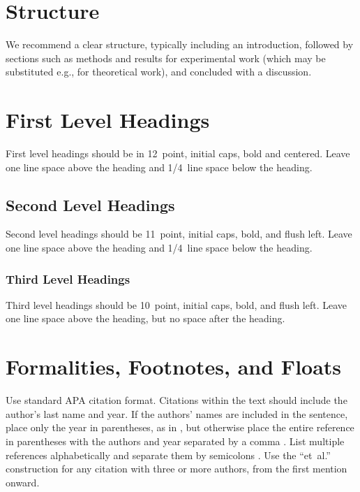 \documentclass{ccn}  %
\begin{document}
\section{Structure}

We recommend a clear structure, typically including an introduction, followed by
sections such as methods and results for experimental work (which may be substituted
e.g., for theoretical work), and concluded with a discussion.

\section{First Level Headings}

First level headings should be in 12~point, initial caps, bold and centered.
Leave one line space above the heading and 1/4~line space below the heading.

\subsection{Second Level Headings}

Second level headings should be 11~point, initial caps, bold, and flush left.
Leave one line space above the heading and 1/4~line space below the heading.

\subsubsection{Third Level Headings}

Third level headings should be 10~point, initial caps, bold, and flush left.
Leave one line space above the heading, but no space after the heading.

\section{Formalities, Footnotes, and Floats}

Use standard APA citation format.
Citations within the text should include the author's last name and year.
If the authors' names are included in the sentence, place only the year in parentheses,
as in \citet{NewellSimon1972a}, but otherwise place the entire reference in parentheses
with the authors and year separated by a comma \citep{NewellSimon1972a}.
List multiple references alphabetically and separate them by semicolons
\citep{ChalnickBillman1988a,NewellSimon1972a}.
Use the ``et~al.'' construction for any citation with three or more authors,
from the first mention onward.
\end{document}
